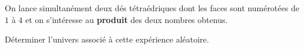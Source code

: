 \begin{exo}
	On lance simultanément deux dés tétraédriques dont les faces sont numérotées de $1$ à $4$ et on s'intéresse au \textbf{produit} des deux nombres obtenus.

	Déterminer l'univers associé à cette expérience aléatoire.
\end{exo}
